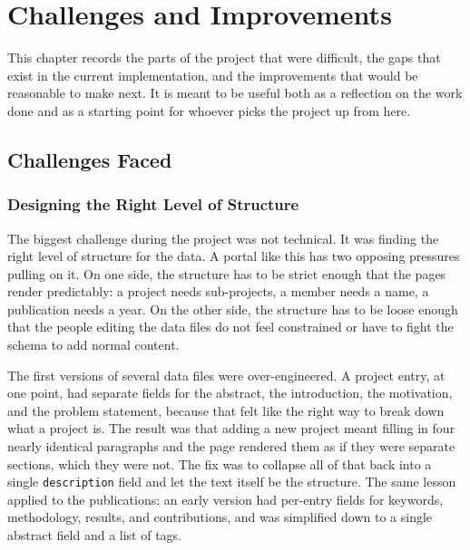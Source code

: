 \chapter{Challenges and Improvements}\label{ch:challenges}

This chapter records the parts of the project that were difficult, the gaps that exist in the current implementation, and the improvements that would be reasonable to make next. It is meant to be useful both as a reflection on the work done and as a starting point for whoever picks the project up from here.

\section{Challenges Faced}\label{sec:challenges-faced}

\subsection{Designing the Right Level of Structure}\label{subsec:challenges-structure}

The biggest challenge during the project was not technical. It was finding the right level of structure for the data. A portal like this has two opposing pressures pulling on it. On one side, the structure has to be strict enough that the pages render predictably: a project needs sub-projects, a member needs a name, a publication needs a year. On the other side, the structure has to be loose enough that the people editing the data files do not feel constrained or have to fight the schema to add normal content.

The first versions of several data files were over-engineered. A project entry, at one point, had separate fields for the abstract, the introduction, the motivation, and the problem statement, because that felt like the right way to break down what a project is. The result was that adding a new project meant filling in four nearly identical paragraphs and the page rendered them as if they were separate sections, which they were not. The fix was to collapse all of that back into a single \texttt{description} field and let the text itself be the structure. The same lesson applied to the publications: an early version had per-entry fields for keywords, methodology, results, and contributions, and was simplified down to a single abstract field and a list of tags.

